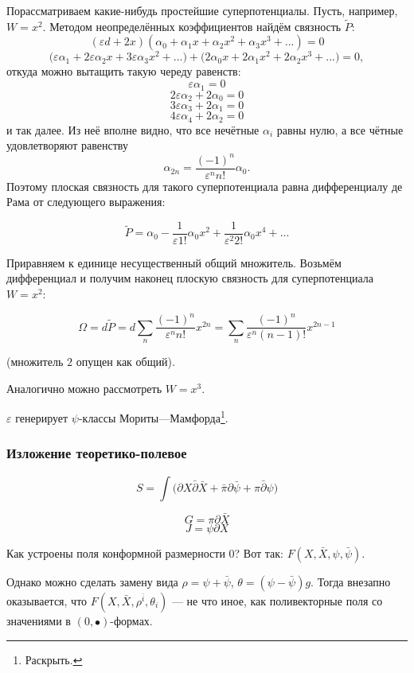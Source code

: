 \documentclass[11pt]{article}
\def\p{\partial}
\theoremstyle{remark}
\theoremstyle{definition}
\newcommand{\que}[1]{\footnote{\textcolor[rgb]{0.38,0.69,0.82}{#1}}}
\begin{document}
Порассматриваем какие-нибудь простейшие суперпотенциалы. Пусть, например, $W = x^2$. Методом неопределённых коэффициентов найдём связность $\tilde P$: $$(\varepsilon d + 2x) (\alpha_0 + \alpha_1 x + \alpha_2 x^2 + \alpha_3 x^3 + ...) = 0$$ $$\Big(\varepsilon \alpha_1 + 2 \varepsilon \alpha_2 x + 3 \varepsilon \alpha_3 x^2 + ...\Big) + \Big(2 \alpha_0 x + 2 \alpha_1 x^2 + 2 \alpha_2 x^3 + ...\Big) = 0,$$ откуда можно вытащить такую череду равенств: $$\varepsilon \alpha_1 = 0$$
$$2 \varepsilon \alpha_2 + 2 \alpha_0 = 0$$
$$3 \varepsilon \alpha_3 + 2 \alpha_1 = 0$$
$$4 \varepsilon \alpha_4 + 2 \alpha_2 = 0$$
 и так далее. Из неё вполне видно, что все нечётные $\alpha_i$ равны нулю, а все чётные удовлетворяют равенству $$\alpha_{2n} = \frac{(-1)^n}{\varepsilon^n n!} \alpha_0.$$ Поэтому плоская связность для такого суперпотенциала равна дифференциалу де Рама от следующего выражения:
 
 $$\tilde P = \alpha_0 - \frac{1}{\varepsilon 1!} \alpha_0 x^2 + \frac{1}{\varepsilon^2 2!} \alpha_0 x^4 + ...$$
 
 Приравняем к единице несущественный общий множитель. Возьмём дифференциал и получим наконец плоскую связность для суперпотенциала $W = x^2$:
 
$$\Omega = d\tilde P = d \sum\limits_n \frac{(-1)^n}{\varepsilon^n n!} x^{2n} = \boxed{\sum\limits_n \frac{(-1)^n}{\varepsilon^n (n-1)!} x^{2n-1} }$$
 
 (множитель $2$ опущен как общий).

Аналогично можно рассмотреть $W = x^3$. 





$\varepsilon$ генерирует $\psi$-классы Мориты---Мамфорда\que{Раскрыть.}.


\subsubsection{Изложение теоретико-полевое}

$$S = \int \Big( \p X \bar \p \bar X + \bar \pi \p \bar \psi + \pi \bar \p \psi  \Big)$$

$$G = \pi \p \bar X$$
$$J = \psi \p X$$

Как устроены поля конформной размерности 0? Вот так: $F(X, \bar X, \psi, \bar \psi)$.

Однако можно сделать замену вида $\rho = \psi + \bar \psi$, $\theta = (\psi - \bar \psi) g$. Тогда внезапно оказывается, что $F(X, \bar X, \rho^{\bar i}, \theta_i)$ --- не что иное, как поливекторные поля со значениями в $(0,\bullet)$-формах.
\end{document}
